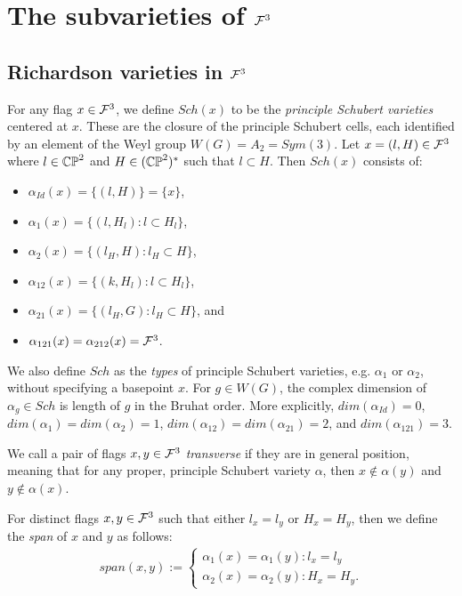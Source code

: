 \section{The subvarieties of $\mathcal{F}^3$}

\subsection{Richardson varieties in $\mathcal{F}^3$}
For any flag $x \in \mathcal{F}^3$, we define $Sch(x)$ to be the \emph{principle Schubert varieties} 
centered at $x$.
These are the closure of the principle Schubert cells, 
each identified by an element of the Weyl group $W(G) = A_2 = Sym(3)$. 
Let $x = (l, H) \in \mathcal{F}^3$ where $l \in \mathbb{CP}^2$ and $H \in (\mathbb{CP}^2)^*$ such that $l \subset H$.
Then $Sch(x)$ consists of:
\begin{itemize}
    \item $\alpha_{Id}(x) = \{ (l, H) \} = \{x\}$,
    \item $\alpha_1(x) = \{ (l, H_l) : l \subset H_l \}$,
    \item $\alpha_2(x) = \{ (l_H, H) : l_H \subset H \}$,
    \item $\alpha_{12}(x) = \{ (k, H_l) : l \subset H_l \}$,
    \item $\alpha_{21}(x) = \{ (l_H, G) : l_H \subset H \}$, and
    \item $\alpha_{121}(x) = \alpha_{212}(x) = \mathcal{F}^3$.
\end{itemize}
We also define $Sch$ as the \emph{types} of principle Schubert varieties,
e.g. $\alpha_1$ or $\alpha_2$, without specifying a basepoint $x$.
For $g \in W(G)$, the complex dimension of $\alpha_g \in Sch$ is length of $g$ in the Bruhat order. 
More explicitly, 
$dim(\alpha_{Id}) = 0$, 
$dim(\alpha_1) = dim(\alpha_2) = 1$,
$dim(\alpha_{12}) = dim(\alpha_{21}) = 2$, 
and $dim(\alpha_{121}) = 3$.

We call a pair of flags $x,y \in \mathcal{F}^3$ \emph{transverse} if they are in general position, 
meaning that for any proper, principle Schubert variety $\alpha$, 
then $x \not \in \alpha(y)$ and $y \not \in \alpha(x)$.

For distinct flags $x,y \in \mathcal{F}^3$ such that either $l_x = l_y$ or $H_x = H_y$,
then we define the \emph{span} of $x$ and $y$ as follows:
\begin{align}
    span(x,y) := \begin{cases}
        \alpha_1(x) = \alpha_1(y) : l_x = l_y \\
        \alpha_2(x) = \alpha_2(y) : H_x = H_y.
    \end{cases}
\end{align}

